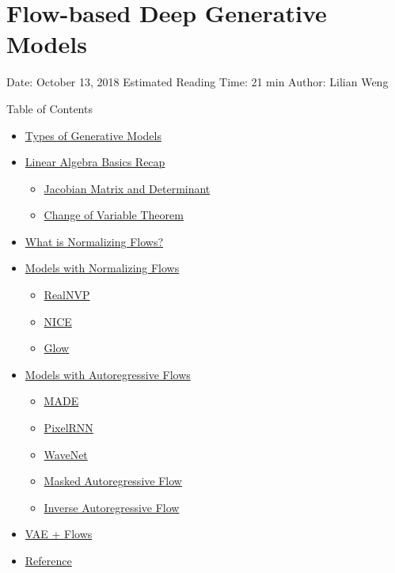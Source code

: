 \section{Flow-based Deep Generative Models}\label{flow-based-deep-generative-models}

Date: October 13, 2018 \textbar{} Estimated Reading Time: 21 min \textbar{} Author: Lilian Weng

{Table of Contents}

\begin{itemize}
\tightlist
\item
  \hyperref[types-of-generative-models]{Types of Generative Models}
\item
  \hyperref[linear-algebra-basics-recap]{Linear Algebra Basics Recap}

  \begin{itemize}
  \tightlist
  \item
    \hyperref[jacobian-matrix-and-determinant]{Jacobian Matrix and Determinant}
  \item
    \hyperref[change-of-variable-theorem]{Change of Variable Theorem}
  \end{itemize}
\item
  \hyperref[what-is-normalizing-flows]{What is Normalizing Flows?}
\item
  \hyperref[models-with-normalizing-flows]{Models with Normalizing Flows}

  \begin{itemize}
  \tightlist
  \item
    \hyperref[realnvp]{RealNVP}
  \item
    \hyperref[nice]{NICE}
  \item
    \hyperref[glow]{Glow}
  \end{itemize}
\item
  \hyperref[models-with-autoregressive-flows]{Models with Autoregressive Flows}

  \begin{itemize}
  \tightlist
  \item
    \hyperref[made]{MADE}
  \item
    \hyperref[pixelrnn]{PixelRNN}
  \item
    \hyperref[wavenet]{WaveNet}
  \item
    \hyperref[masked-autoregressive-flow]{Masked Autoregressive Flow}
  \item
    \hyperref[inverse-autoregressive-flow]{Inverse Autoregressive Flow}
  \end{itemize}
\item
  \hyperref[vae--flows]{VAE + Flows}
\item
  \hyperref[reference]{Reference}
\end{itemize}

